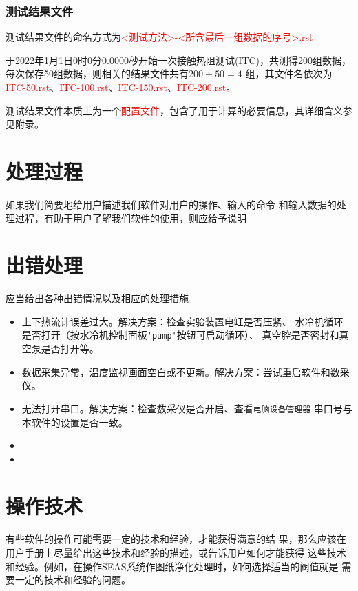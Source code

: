 \subsubsection*{测试结果文件}
测试结果文件的命名方式为\textcolor{red}{<测试方法>-<所含最后一组数据的序号>.rst}
\begin{example}
    于2022年1月1日0时0分0.0000秒开始一次接触热阻测试(ITC)，共测得200组数据，每次保存50组数据，则相关的结果文件共有$200\div 50 = 4$
    组，其文件名依次为\textcolor{red}{ITC-50.rst}、\textcolor{red}{ITC-100.rst}、\textcolor{red}{ITC-150.rst}、\textcolor{red}{ITC-200.rst}。
\end{example}
测试结果文件本质上为一个\textcolor{red}{配置文件}，包含了用于计算的必要信息，其详细含义参见附录。

\section{处理过程}
如果我们简要地给用户描述我们软件对用户的操作、输入的命令
和输入数据的处理过程，有助于用户了解我们软件的使用，则应给予说明
\section{出错处理}
应当给出各种出错情况以及相应的处理措施
\begin{itemize}
    \item 上下热流计误差过大。解决方案：检查实验装置电缸是否压紧、
    水冷机循环是否打开（按水冷机控制面板\lstinline{'pump'}按钮可启动循环）、
    真空腔是否密封和真空泵是否打开等。
    \item 数据采集异常，温度监视画面空白或不更新。解决方案：尝试重启软件和数采仪。
    \item 无法打开串口。解决方案：检查数采仪是否开启、查看\lstinline{电脑设备管理器}
    串口号与本软件的设置是否一致。
    \item 
    \item 
\end{itemize}

\section{操作技术}
有些软件的操作可能需要一定的技术和经验，才能获得满意的结
果，那么应该在用户手册上尽量给出这些技术和经验的描述，或告诉用户如何才能获得
这些技术和经验。例如，在操作SEAS系统作图纸净化处理时，如何选择适当的阀值就是
需要一定的技术和经验的问题。
